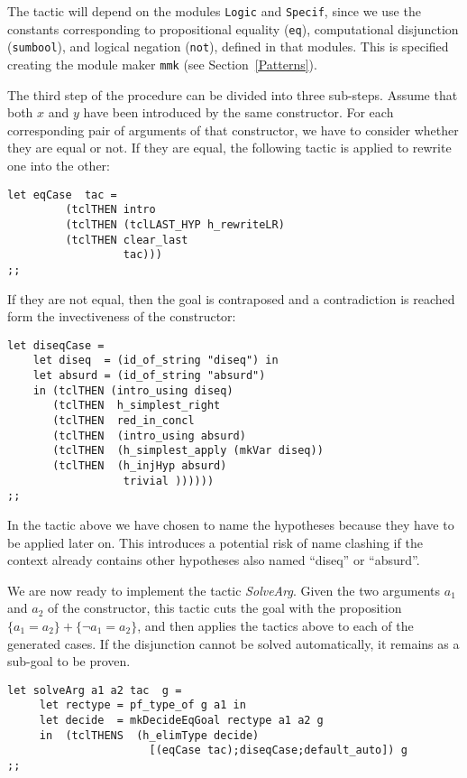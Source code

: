 The tactic will depend on the \Coq modules \texttt{Logic} and
\texttt{Specif}, since we use the constants corresponding to
propositional equality (\texttt{eq}), computational disjunction
(\texttt{sumbool}), and logical negation (\texttt{not}), defined in
that modules. This is specified creating the module maker
\texttt{mmk} (see Section~\ref{Patterns}).

The third step of the procedure can be divided into three sub-steps.
Assume that both $x$ and $y$ have been introduced by the same
constructor.  For each corresponding pair of arguments of that
constructor, we have to consider whether they are equal or not.  If
they are equal, the following tactic is applied to rewrite one into
the other:

\begin{verbatim}
let eqCase  tac = 
         (tclTHEN intro  
         (tclTHEN (tclLAST_HYP h_rewriteLR)
         (tclTHEN clear_last 
                  tac)))
;;
\end{verbatim}


If they are not equal, then the goal is contraposed and a
contradiction is reached form the invectiveness of the constructor:

\begin{verbatim}
let diseqCase = 
    let diseq  = (id_of_string "diseq") in
    let absurd = (id_of_string "absurd")
    in (tclTHEN (intro_using diseq)
       (tclTHEN  h_simplest_right
       (tclTHEN  red_in_concl
       (tclTHEN  (intro_using absurd)
       (tclTHEN  (h_simplest_apply (mkVar diseq))
       (tclTHEN  (h_injHyp absurd)
                  trivial ))))))
;;
\end{verbatim}

In the tactic above we have chosen to name the hypotheses because
they have to be applied later on. This introduces a potential risk
of name clashing if the context already contains other hypotheses 
also named ``diseq'' or ``absurd''.

We are now ready to implement the tactic \textsl{SolveArg}.  Given the
two arguments $a_1$ and $a_2$ of the constructor, this tactic cuts the
goal with the proposition $\{a_1=a_2\}+\{\neg a_1=a_2\}$, and then
applies the tactics above to each of the generated cases. If the
disjunction cannot be solved automatically, it remains as a sub-goal
to be proven.

\begin{verbatim}
let solveArg a1 a2 tac  g = 
     let rectype = pf_type_of g a1 in
     let decide  = mkDecideEqGoal rectype a1 a2 g
     in  (tclTHENS  (h_elimType decide) 
                      [(eqCase tac);diseqCase;default_auto]) g
;;
\end{verbatim}

